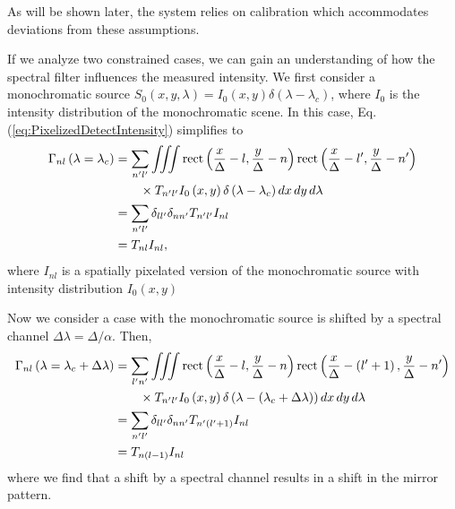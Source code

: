 As will be shown later, the system relies on calibration which accommodates deviations from these assumptions.

If we analyze two constrained cases, we can gain an understanding of how the spectral filter influences the measured intensity.
We first consider a monochromatic source $S_0 \left(x, y, \lambda\right) = I_0 \left(x, y \right) \delta \left( \lambda - \lambda_c \right)$, where $I_0$ is the intensity distribution of the monochromatic scene. In this case, Eq.(\ref{eq:PixelizedDetectIntensity}) simplifies to
%
%
\begin{align} \label{eq:MonoChrome}
\Gamma_{nl} \left(\lambda = \lambda_c \right) &= \sum_{ n^\prime l^\prime} \iiint \mbox{rect} \left( \frac{x}{\Delta} -  l, \frac{y}{\Delta} - n \right)  \mbox{rect} \left( \frac{x}{\Delta} - l^\prime, \frac{y}{\Delta} - n^\prime \right) \notag \\
 &\qquad \times T_{n^\prime l^\prime} I_0 \left( x, y \right) \delta \left( \lambda - \lambda_c \right) dx \, dy \, d\lambda  \notag \\
 &= \sum_{n^\prime l^\prime} \delta_{ll^\prime} \delta_{nn^\prime} T_{n^\prime l^\prime} I_{nl} \notag \\
 &= T_{nl} I_{nl},
\end{align}
%
%
where $I_{nl}$ is a spatially pixelated version of the monochromatic source with intensity distribution $I_0 \left(x, y \right)$

Now we consider a case with the monochromatic source is shifted by a spectral channel $\Delta \lambda = \Delta / \alpha$. Then,
%
\begin{align} \label{eq:Mono2}
	\Gamma_{nl}\left(\lambda = \lambda_c + \Delta \lambda\right) &= \sum_{l'n'} \iiint \mbox{rect} \left( \frac{x}{\Delta} - l, \frac{y}{\Delta} - n \right)  \mbox{rect} \left( \frac{x}{\Delta} - \left(l' + 1 \right), \frac{y}{\Delta} - n' \right) \notag \\
 	&\qquad \times T_{n'l'} I_0 \left( x, y \right) \delta \left( \lambda - \left( \lambda_c + \Delta \lambda \right)\right) dx \, dy \, d\lambda  \notag \\
 	&= \sum_{n'l'} \delta_{ll'} \delta_{nn'} T_{n' \left( l' + 1 \right)} I_{nl} \notag \\
 	&= T_{n\left(l - 1 \right)} I_{nl}
 \end{align}
%
where we find that a shift by a spectral channel results in a shift in the mirror pattern.

